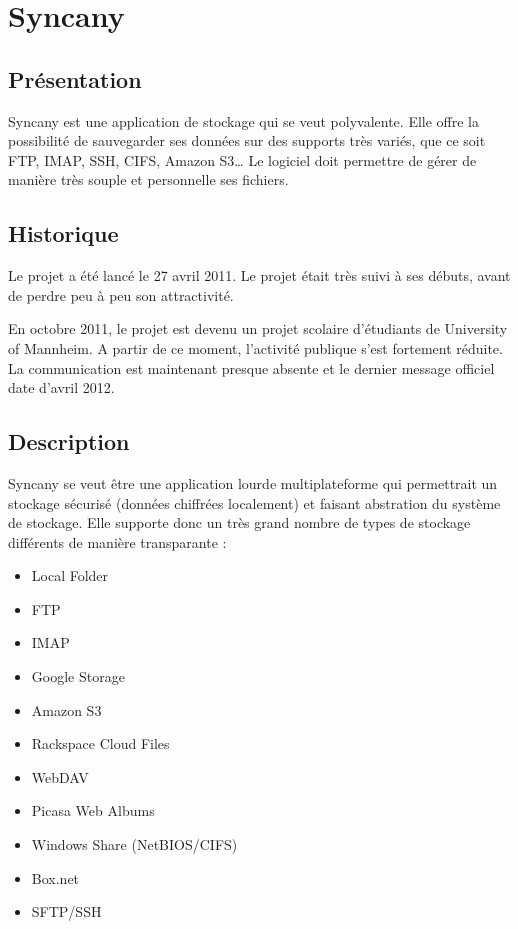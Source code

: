 \chapter{Syncany}
\thispagestyle{EIP} %
\section{Présentation}
Syncany est une application de stockage qui se veut polyvalente. Elle offre la possibilité de sauvegarder ses données sur des supports très variés, que ce soit FTP, IMAP, SSH, CIFS, Amazon S3… Le logiciel doit permettre de gérer de manière très souple et personnelle ses fichiers.

\section{Historique}
Le projet a été lancé le 27 avril 2011. Le projet était très suivi à ses débuts, avant de perdre peu à peu son attractivité. 

En octobre 2011, le projet est devenu un projet scolaire d'étudiants de University of Mannheim. A partir de ce moment, l'activité publique s'est fortement réduite. La communication est maintenant presque absente et le dernier message officiel date d'avril 2012.

\section{Description}
Syncany se veut être une application lourde multiplateforme qui permettrait un stockage sécurisé (données chiffrées localement) et faisant abstration du système de stockage. Elle supporte donc un très grand nombre de types de stockage différents de manière transparante :

\begin{itemize}
\renewcommand{\labelitemi}{$\bullet$}
\item Local Folder
\item FTP
\item IMAP
\item Google Storage
\item Amazon S3
\item Rackspace Cloud Files
\item WebDAV
\item Picasa Web Albums
\item Windows Share (NetBIOS/CIFS)
\item Box.net
\item SFTP/SSH
\end{itemize}

